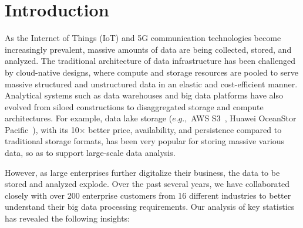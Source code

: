 \section{Introduction} 
\label{sec:intro}


As the Internet of Things (IoT) and 5G communication technologies become increasingly prevalent, massive amounts of data are being collected, stored, and analyzed.
 The traditional architecture of data infrastructure  has been challenged by cloud-native designs, where compute and storage resources are pooled to serve massive structured and unstructured data in an elastic and cost-efficient manner.
  Analytical systems such as data warehouses and big data platforms have also evolved from siloed constructions to disaggregated storage and compute architectures. For example, data lake storage ($e.g.,$ AWS S3~\cite{s3}, Huawei OceanStor Pacific~\cite{huawei}), with its 10$\times$ better price, availability, and persistence compared to traditional storage formats, has been very popular for storing massive various data, so as to support large-scale data analysis.


However, as large enterprises further digitalize their business, the data to be stored and analyzed explode. Over the past several years, we have collaborated closely with over 200 enterprise customers from 16 different industries to better understand their big data processing requirements. Our analysis of key statistics has revealed the following insights:

